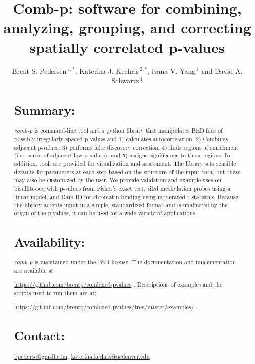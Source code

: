 \documentclass{bioinfo}
\begin{document}

\title[comb-p]{Comb-p: software for combining, analyzing, grouping, and correcting spatially correlated p-values}
\author[Pedersen \textit{et~al}]{Brent S. Pedersen\,$^{1,*}$,
Katerina J.  Kechris\,$^{2,*}$,
    Ivana V. Yang\,$^{1}$ and David A. Schwartz\,$^1$}
\address{$^{1}$Department of Medicine, University of Colorado, Denver, Anschutz Medical Campus, Aurora CO 80045, 
USA\\
$^{2}$Department of Statistics, University of Colorado, Denver, Anschutz Medical Campus, Aurora CO 80045, USA\\
}
\maketitle
\begin{abstract}

\section{Summary:}
\textit{comb-p} is command-line tool and a python library that
manipulates BED files of possibly irregularly spaced p-values and
1) calculates autocorrelation,
2) Combines adjacent p-values,
3) performs false discovery correction,
4) finds regions of enrichment (i.e., series of adjacent low p-values), and
5) assigns significance to those regions.
In addition, tools are provided for visualization and
assessment. The library sets sensible defaults for parameters at each
step based on the structure of the input data, but these may also be customized
by the user. We provide validation and example uses on bisulfite-seq with p-values
from Fisher's exact test,
tiled methylation probes using a linear model, and Dam-ID for chromatin binding
using moderated t-statistics. Because the library
accepts input in a simple, standardized format and is unaffected by the origin
of the p-values, it can be used for a wide variety of applications.

\section{Availability:}
\textit{comb-p} is maintained under the BSD license. The documentation and
implementation are available at

\href{https://github.com/brentp/combined-pvalues}{https://github.com/brentp/combined-pvalues} .
Descriptions of examples and the scripts used to run them are at:

\href{https://github.com/brentp/combined-pvalues/tree/master/examples/}{https://github.com/brentp/combined-pvalues/tree/master/examples/} 
.

\section{Contact:} \href{bpederse@gmail.com}{bpederse@gmail.com},
\href{katerina.kechris@ucdenver.edu}{katerina.kechris@ucdenver.edu}

\end{abstract}
\end{document}
